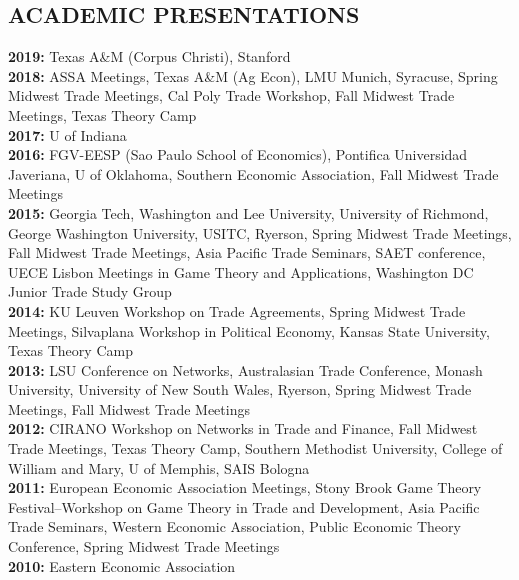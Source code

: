 \documentclass[11pt]{res}
\begin{document}
\begin{resume}
\section{ACADEMIC PRESENTATIONS}\vspace{1.5mm}
{\bf 2019:} Texas A\&M (Corpus Christi)\vspace{1.5mm}, Stanford\\
{\bf 2018:} ASSA Meetings, Texas A\&M (Ag Econ), LMU Munich, Syracuse, Spring Midwest Trade Meetings, Cal Poly Trade Workshop, Fall Midwest Trade Meetings, Texas Theory Camp \vspace{1.5mm}\\
{\bf 2017:} U of Indiana \vspace{1.5mm}\\
{\bf 2016:} FGV-EESP (Sao Paulo School of Economics), Pontifica Universidad Javeriana, U of Oklahoma, Southern Economic Association, Fall Midwest Trade Meetings\vspace{1.5mm}\\
{\bf 2015:} Georgia Tech, Washington and Lee University, University of Richmond, George Washington University, USITC, Ryerson, Spring Midwest Trade Meetings, Fall Midwest Trade Meetings, Asia Pacific Trade Seminars, SAET conference, UECE Lisbon Meetings in Game Theory and Applications, Washington DC Junior Trade Study Group\vspace{1.5mm}\\
{\bf 2014:} KU Leuven Workshop on Trade Agreements, Spring Midwest Trade Meetings, Silvaplana Workshop in Political Economy, Kansas State University, Texas Theory Camp\vspace{1.5mm}\\
{\bf 2013:} LSU Conference on Networks, Australasian Trade Conference, Monash University, University of New South Wales, Ryerson, Spring Midwest Trade Meetings, Fall Midwest Trade Meetings \vspace{1.5mm}\\
{\bf 2012:}  CIRANO Workshop on Networks in Trade and Finance, Fall Midwest Trade Meetings, Texas Theory Camp, Southern Methodist University, College of William and Mary, U of Memphis, SAIS Bologna\vspace{1.5mm}\\
{\bf 2011:} European Economic Association Meetings, Stony Brook Game Theory Festival--Workshop on Game Theory in Trade and Development, Asia Pacific Trade Seminars, Western Economic Association, Public Economic Theory Conference, Spring Midwest Trade Meetings\vspace{1.5mm}\\
{\bf 2010:} Eastern Economic Association


\end{resume}
\end{document}
